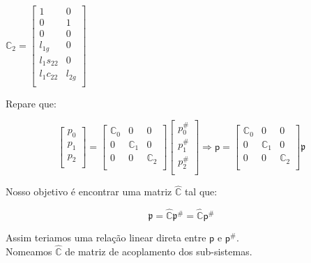 \documentclass[12pt,a4paper]{article}
\begin{document}
\begin{itemize}
\begin{itemize}
\begin{multicols}{3}
	$ \mathbb{C}_2 =
	\begin{bmatrix}
	1 & 0 \\
	0 & 1 \\
	0 & 0 \\
	l_{1g} & 0\\
	l_1 s_{22} & 0 \\
	l_1 c_{22} & l_{2g} \\
	\end{bmatrix}
	$ \\
	\end{multicols}
	
	Repare que:
	
	\begin{equation}
	\begin{bmatrix}
	p_0 \\
	p_1 \\
	p_2 \\
	\end{bmatrix}
	=
	\begin{bmatrix}
	\mathbb{C}_0 & 0 & 0 \\
	0 & \mathbb{C}_1 & 0 \\
	0 & 0 & \mathbb{C}_2 \\
	\end{bmatrix}
	\begin{bmatrix}
	p_0^{\#} \\
	p_1^{\#} \\
	p_2^{\#} \\
	\end{bmatrix}
	\Rightarrow
	\mathsf{p} =
	\begin{bmatrix}
	\mathbb{C}_0 & 0 & 0 \\
	0 & \mathbb{C}_1 & 0 \\
	0 & 0 & \mathbb{C}_2 \\
	\end{bmatrix}
	\mathfrak{p}
	\end{equation}
	
	Nosso objetivo é encontrar uma matriz $\hat{\mathbb{C}}$ tal que:
	
	\begin{equation}
	\mathfrak{p} = \hat{\mathbb{C}} \mathfrak{p}^{\#} = \hat{\mathbb{C}} \mathsf{p}^{\#}
	\end{equation}
	
	Assim teriamos uma relação linear direta entre $\mathsf{p}$ e $\mathsf{p}^{\#}$. \\
	Nomeamos $\hat{\mathbb{C}}$ de matriz de acoplamento dos sub-sistemas. \\
	

\end{itemize}
\end{itemize}
\end{document}
